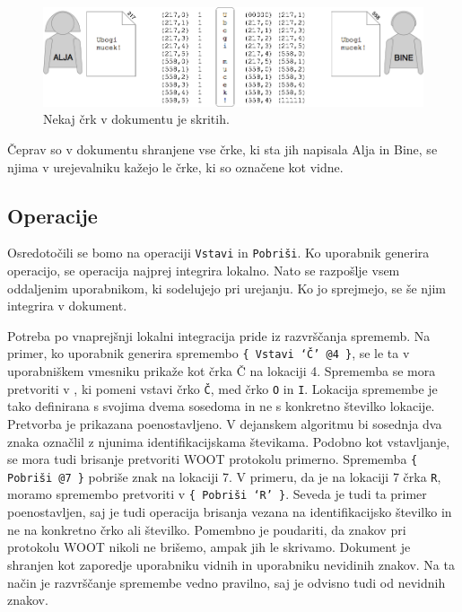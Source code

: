 \documentclass[a4paper, 12pt, twoside]{book}
\begin{document}
\begin{figure}[placement h]
\begin{center}
\includegraphics[width=16cm]{woot2.png}
\end{center}
\caption{Nekaj črk v dokumentu je skritih.}
\label{woot2}
\end{figure}

Čeprav so v dokumentu shranjene vse črke, ki sta jih napisala Alja in Bine, se njima v urejevalniku kažejo le črke, ki so označene kot vidne.

\subsection{Operacije}

Osredotočili se bomo na operaciji {\tt Vstavi} in {\tt Pobriši}. Ko uporabnik generira operacijo, se operacija najprej integrira lokalno. Nato se razpošlje vsem oddaljenim uporabnikom, ki sodelujejo pri urejanju. Ko jo sprejmejo, se še njim integrira v dokument. 

Potreba po vnaprejšnji lokalni integracija pride iz razvrščanja sprememb. Na primer, ko uporabnik generira spremembo {\tt \{ Vstavi ‘Č’ @4 \}}, se le ta v uporabniškem vmesniku prikaže kot črka Č na lokaciji 4. Sprememba se mora pretvoriti v , ki pomeni vstavi črko {\tt Č}, med črko {\tt O} in {\tt I}. Lokacija spremembe je tako definirana s svojima dvema sosedoma in ne s konkretno številko lokacije. Pretvorba je prikazana poenostavljeno. V dejanskem algoritmu bi sosednja dva znaka označlil z njunima identifikacijskama števikama. Podobno kot vstavljanje, se mora tudi brisanje pretvoriti WOOT protokolu primerno. Sprememba {\tt \{ Pobriši @7 \}} pobriše znak na lokaciji 7. V primeru, da je na lokaciji 7 črka {\tt R}, moramo spremembo pretvoriti v {\tt \{ Pobriši ‘R’ \}}. Seveda je tudi ta primer poenostavljen, saj je tudi operacija brisanja vezana na identifikacijsko številko in ne na konkretno črko ali številko. Pomembno je poudariti, da znakov pri protokolu WOOT nikoli ne brišemo, ampak jih le skrivamo. Dokument je shranjen kot zaporedje uporabniku vidnih in uporabniku nevidinih znakov. Na ta način je razvrščanje spremembe vedno pravilno, saj je odvisno tudi od nevidnih znakov.
\end{document}
